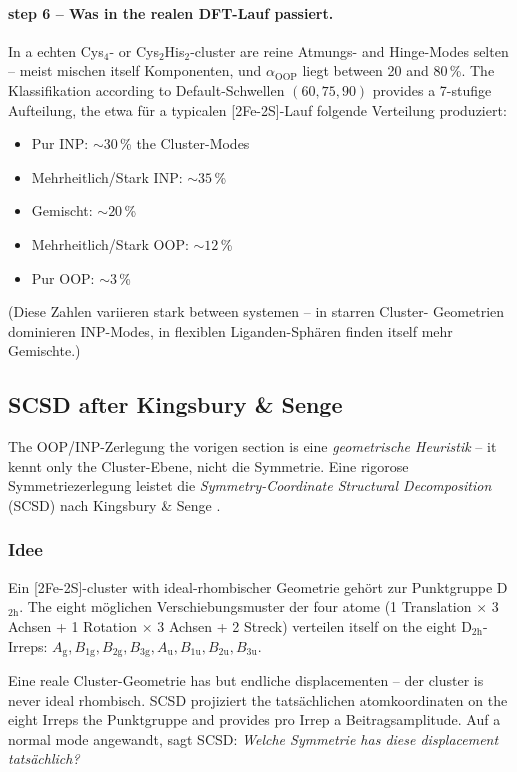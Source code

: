 \documentclass[11pt,a4paper,twoside]{article}
\newcommand{\OOP}{\mathrm{OOP}}
\newcommand{\Ag}{A_{\mathrm{g}}}
\newcommand{\Bgi}[1]{B_{\mathrm{#1g}}}
\newcommand{\Bui}[1]{B_{\mathrm{#1u}}}
\newcommand{\Aui}{A_{\mathrm{u}}}
\theoremstyle{remark}
\begin{document}
\paragraph{step 6 -- Was in the realen DFT-Lauf passiert.}
In a echten Cys$_4$- or Cys$_2$His$_2$-cluster are reine
Atmungs- and Hinge-Modes selten -- meist mischen itself Komponenten,
und $\alpha_{\OOP}$ liegt between 20 and 80\,\%. The Klassifikation
according to Default-Schwellen $(60, 75, 90)$ provides a 7-stufige
Aufteilung, the etwa f\"ur a typicalen [2Fe-2S]-Lauf
folgende Verteilung produziert:
\begin{itemize}\setlength{\itemsep}{0pt}
  \item Pur INP: $\sim 30$\,\% the Cluster-Modes
  \item Mehrheitlich/Stark INP: $\sim 35$\,\%
  \item Gemischt: $\sim 20$\,\%
  \item Mehrheitlich/Stark OOP: $\sim 12$\,\%
  \item Pur OOP: $\sim 3$\,\%
\end{itemize}
(Diese Zahlen variieren stark between systemen -- in starren Cluster-
Geometrien dominieren INP-Modes, in flexiblen Liganden-Sph\"aren
finden itself mehr Gemischte.)

\subsection{SCSD after Kingsbury \& Senge}
\label{sec:scsd}

The OOP/INP-Zerlegung the vorigen section is eine
\emph{geometrische Heuristik} -- it kennt only the Cluster-Ebene, nicht
die Symmetrie. Eine rigorose Symmetriezerlegung leistet die
\emph{Symmetry-Coordinate Structural Decomposition} (SCSD) nach
Kingsbury \& Senge \cite{Kingsbury2024}.

\subsubsection*{Idee}

Ein {[}2Fe-2S{]}-cluster with ideal-rhombischer Geometrie geh\"ort zur
Punktgruppe D$_\mathrm{2h}$. The eight m\"oglichen Verschiebungsmuster
der four atome (1 Translation $\times$ 3 Achsen + 1 Rotation $\times$
3 Achsen + 2 Streck) verteilen itself on the eight D$_\mathrm{2h}$-Irreps:
$\Ag, \Bgi{1}, \Bgi{2}, \Bgi{3}, \Aui, \Bui{1}, \Bui{2}, \Bui{3}$.

Eine reale Cluster-Geometrie has but endliche displacementen -- der
cluster is never ideal rhombisch. SCSD projiziert the tats\"achlichen
atomkoordinaten on the eight Irreps the Punktgruppe and provides pro
Irrep a Beitragsamplitude. Auf a normal mode angewandt, sagt
SCSD: \emph{Welche Symmetrie has diese displacement tats\"achlich?}
\end{document}
